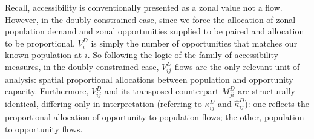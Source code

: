\documentclass[
  10pt,
  letterpaper,
]{article}
\begin{document}
\begin{table}

\caption{\label{tbl-adjusted-small-system-land-use-doubly-constrained-case-allfs-access-values-for-zone2}Doubly
constrained accessible opportunities at Zone 2 for all travel decay
groups in the modified simple system.}


\end{table}%

Recall, accessibility is conventionally presented as a zonal value not a
flow. However, in the doubly constrained case, since we force the
allocation of zonal population demand and zonal opportunities supplied
to be paired and allocation to be proportional, \(V_i^D\) is simply the
number of opportunities that matches our known population at \(i\). So
following the logic of the family of accessibility measures, in the
doubly constrained case, \(V_{ij}^D\) flows are the only relevant unit
of analysis: spatial proportional allocations between population and
opportunity capacity. Furthermore, \(V^D_{ij}\) and its transposed
counterpart \(M^D_{ji}\) are structurally identical, differing only in
interpretation (referring to \(\kappa_{ij}^D\) and
\(\hat \kappa_{ij}^D\)): one reflects the proportional allocation of
opportunity to population flows; the other, population to opportunity
flows.
\end{document}
